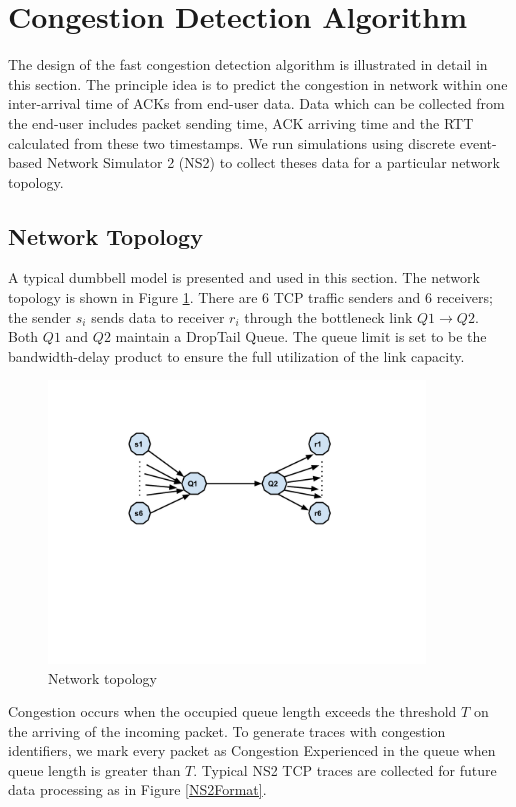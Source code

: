 \section{Congestion Detection Algorithm}
\label{Design}
The design of the fast congestion detection algorithm is illustrated in detail in this section. The principle idea is to predict the congestion in network within one inter-arrival time of ACKs from end-user data. Data which can be collected from the end-user includes packet sending time, ACK arriving time and the RTT calculated from these two timestamps. We run simulations using discrete event-based Network Simulator 2 (NS2) to collect theses data for a particular network topology. 
\subsection{Network Topology}
A typical dumbbell model is presented and used in this section. The network topology is shown in Figure \ref{layout}. There are $6$ TCP traffic senders and $6$ receivers; the sender $s_{i}$ sends data to receiver $r_{i}$ through the bottleneck link $Q1\to Q2$. Both $Q1$ and $Q2$ maintain a DropTail Queue. The queue limit is set to be the bandwidth-delay product to ensure the full utilization of the link capacity.

\begin{figure}
\centering
\includegraphics[width=10cm]{6layout.pdf}
\caption{Network topology}
\label{layout}
\end{figure}
Congestion occurs when the occupied queue length exceeds the threshold $T$ on the arriving of the incoming packet. To generate traces with congestion identifiers, we mark every packet as Congestion Experienced in the queue when queue length is greater than $T$. Typical NS2 TCP traces  \cite{TraceFormat} are collected for future data processing as in Figure \ref{NS2Format}. 

